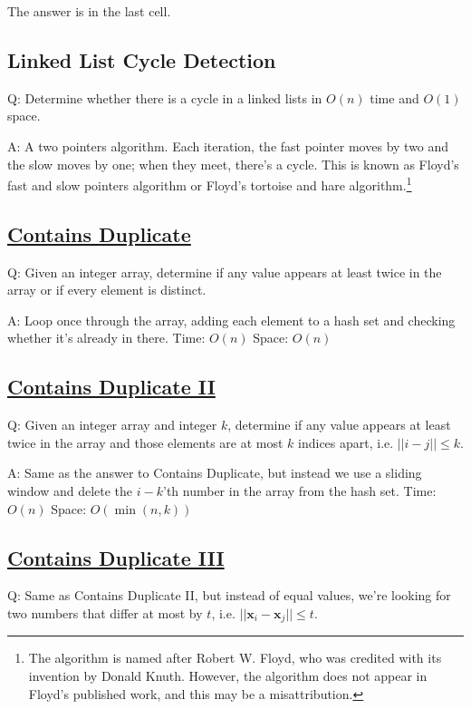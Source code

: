 \documentclass[8pt, table, xcdraw]{article}%
\begin{document}
The answer is in the last cell.

\subsection{Linked List Cycle Detection}

Q: Determine whether there is a cycle in a linked lists in $O(n)$ time and $O(1)$ space.

A: A two pointers algorithm. Each iteration, the fast pointer moves by two and the slow moves by one; when they meet, there's a cycle. This is known as Floyd's fast and slow pointers algorithm or Floyd's tortoise and hare algorithm.\footnote{The algorithm is named after Robert W. Floyd, who was credited with its invention by Donald Knuth. However, the algorithm does not appear in Floyd's published work, and this may be a misattribution.}

\subsection{\href{https://leetcode.com/problems/contains-duplicate}{Contains Duplicate}}

Q: Given an integer array, determine if any value appears at least twice in the array or if every element is distinct.

A: Loop once through the array, adding each element to a hash set and checking whether it's already in there. Time: $O(n)$ Space: $O(n)$

\subsection{\href{https://leetcode.com/problems/contains-duplicate-ii}{Contains Duplicate II}}

Q: Given an integer array and integer $k$, determine if any value appears at least twice in the array and those elements are at most $k$ indices apart, i.e. $||i - j|| \leq k$.

A: Same as the answer to Contains Duplicate, but instead we use a sliding window and delete the $i - k$'th number in the array from the hash set. Time: $O(n)$ Space: $O(\min(n,k))$

\subsection{\href{https://leetcode.com/problems/contains-duplicate-iii}{Contains Duplicate III}}

Q: Same as Contains Duplicate II, but instead of equal values, we're looking for two numbers that differ at most by $t$, i.e. $||\mathbf{x}_i - \mathbf{x}_j|| \leq t$.
\end{document}
